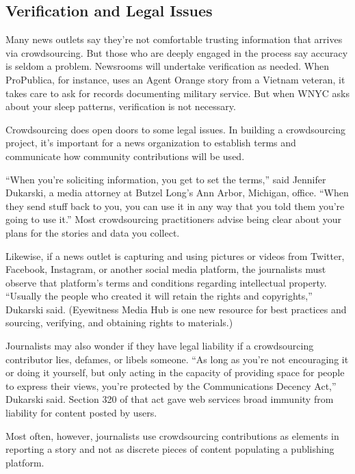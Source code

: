 \begin{itemize}
\begin{itemize}
\begin{enumerate}
{\chapter{Verification and Legal Issues}

Many news outlets say they’re not comfortable trusting information that arrives via crowdsourcing. But those who are deeply engaged in the process say accuracy is seldom a problem. Newsrooms will undertake verification as needed. When ProPublica, for instance, uses an Agent Orange story from a Vietnam veteran, it takes care to ask for records documenting military service. But when WNYC asks about your sleep patterns, verification is not necessary.

Crowdsourcing does open doors to some legal issues. In building a crowdsourcing project, it’s important for a news organization to establish terms and communicate how community contributions will be used. 

“When you’re soliciting information, you get to set the terms,” said Jennifer Dukarski, a media attorney at Butzel Long’s Ann Arbor, Michigan, office. “When they send stuff back to you, you can use it in any way that you told them you’re going to use it.”\autocite{Dukarski} Most crowdsourcing practitioners advise being clear about your plans for the stories and data you collect.

Likewise, if a news outlet is capturing and using pictures or videos from Twitter, Facebook, Instagram, or another social media platform, the journalists must observe that platform’s terms and conditions regarding intellectual property. “Usually the people who created it will retain the rights and copyrights,” Dukarski said. (Eyewitness Media Hub is one new resource for best practices and sourcing, verifying, and obtaining rights to materials.)\autocite{EyewitnessMediaHub}

Journalists may also wonder if they have legal liability if a crowdsourcing contributor lies, defames, or libels someone. “As long as you’re not encouraging it or doing it yourself, but only acting in the capacity of providing space for people to express their views, you’re protected by the Communications Decency Act,” Dukarski said. Section 320 of that act gave web services broad immunity from liability for content posted by users. 

Most often, however, journalists use crowdsourcing contributions as elements in reporting a story and not as discrete pieces of content populating a publishing platform.

}
\end{enumerate}
\end{itemize}
\end{itemize}

